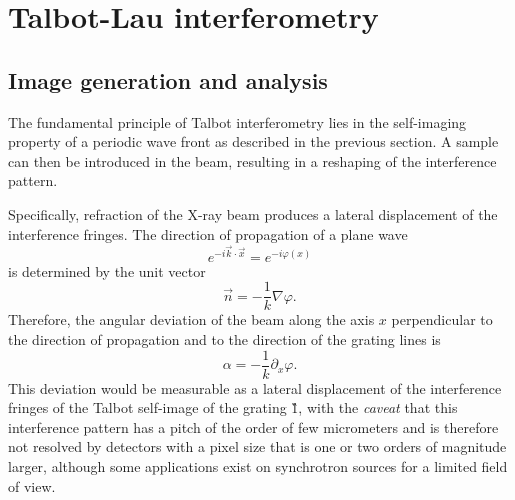 \section{Talbot-Lau interferometry}
\subsection{Image generation and analysis}\label{sec:gi-image-analysis}
The fundamental principle of Talbot interferometry lies in the self-imaging
property of a periodic wave front as described in the previous section. A
sample can then be introduced in the beam, resulting in a reshaping of the
interference pattern.

Specifically, refraction of the X-ray beam produces a lateral displacement
of the interference fringes. The direction of propagation of a plane wave
\begin{equation}
    e^{-i \vec{k} \cdot \vec{x}} = e^{-i\varphi(x)}
    \label{eq:plane.wave}
\end{equation}
is determined by the unit vector
\begin{equation}
    \vec{n} = -\frac{1}{k} \nabla\varphi.
    \label{eq:plane.wave.direction}
\end{equation}
Therefore, the angular deviation of the beam along the axis $x$ perpendicular to
the direction of propagation and to the direction of the grating lines is
\begin{equation}
        \alpha = -\frac{1}{k} \partial_x\varphi.\label{eq:refraction.angle}
\end{equation}
This deviation would be measurable as a lateral displacement of the
interference fringes of the Talbot self-image of the grating \G1, with the
\emph{caveat} that this interference pattern has a pitch of the order of
few micrometers and is therefore not resolved by detectors with a pixel size
that is one or two orders of magnitude larger, although some applications
exist on synchrotron sources for a limited field of view\cn.


